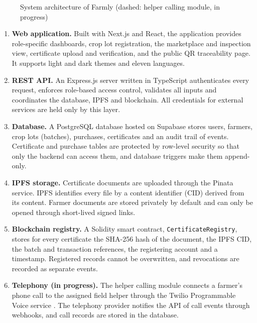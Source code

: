 \begin{figure}[!ht]
\caption{System architecture of Farmly (dashed: helper calling module, in progress)}
\label{fig:arch}
\end{figure}

\begin{enumerate}
	\item \textbf{Web application.} Built with Next.js and React, the application provides role-specific dashboards, crop lot registration, the marketplace and inspection view, certificate upload and verification, and the public QR traceability page. It supports light and dark themes and eleven languages.
	\item \textbf{REST API.} An Express.js server written in TypeScript authenticates every request, enforces role-based access control, validates all inputs and coordinates the database, IPFS and blockchain. All credentials for external services are held only by this layer.
	\item \textbf{Database.} A PostgreSQL database hosted on Supabase stores users, farmers, crop lots (batches), purchases, certificates and an audit trail of events. Certificate and purchase tables are protected by row-level security so that only the backend can access them, and database triggers make them append-only.
	\item \textbf{IPFS storage.} Certificate documents are uploaded through the Pinata service. IPFS identifies every file by a content identifier (CID) derived from its content. Farmer documents are stored privately by default and can only be opened through short-lived signed links.
	\item \textbf{Blockchain registry.} A Solidity smart contract, \texttt{Certificate}\allowbreak\texttt{Registry}, stores for every certificate the SHA-256 hash of the document, the IPFS CID, the batch and transaction references, the registering account and a timestamp. Registered records cannot be overwritten, and revocations are recorded as separate events.
	\item \textbf{Telephony (in progress).} The helper calling module connects a farmer's phone call to the assigned field helper through the Twilio Programmable Voice service \cite{twiliovoice}. The telephony provider notifies the API of call events through webhooks, and call records are stored in the database.
\end{enumerate}

